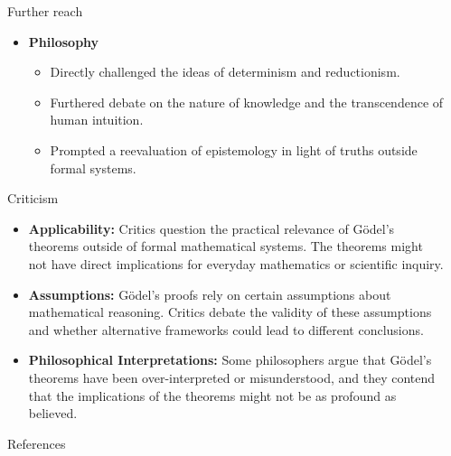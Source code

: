 \documentclass[final]{beamer}
\newlength{\sepwidth}
\newlength{\colwidth}
\newcommand{\separatorcolumn}{\begin{column}{\sepwidth}\end{column}}
\begin{document}
\begin{frame}[t]
\begin{columns}[t]
\begin{column}{\colwidth}
\begin{block}{Further reach}
\begin{itemize}
\begin{itemize}
        \end{itemize}
      
      \item \textbf{Philosophy}
        \begin{itemize}
            \item Directly challenged the ideas of determinism and reductionism.
            \item Furthered debate on the nature of knowledge and the transcendence of human intuition.
            \item Prompted a reevaluation of epistemology in light of truths outside formal systems.
        \end{itemize}
    \end{itemize}
    
\end{block}

\begin{block}{Criticism}
    \begin{itemize}
        \item \textbf{Applicability:} Critics question the practical relevance of Gödel's theorems outside of formal mathematical systems. The theorems might not have direct implications for everyday mathematics or scientific inquiry.
        
        \item \textbf{Assumptions:} Gödel's proofs rely on certain assumptions about mathematical reasoning. Critics debate the validity of these assumptions and whether alternative frameworks could lead to different conclusions.

        \item \textbf{Philosophical Interpretations:} Some philosophers argue that Gödel's theorems have been over-interpreted or misunderstood, and they contend that the implications of the theorems might not be as profound as believed.
        
    \end{itemize}

\end{block}

  \begin{block}{References}
    \nocite{*}
    \footnotesize{}

  \end{block}

\end{column}

\separatorcolumn
\end{columns}
\end{frame}
\end{document}
